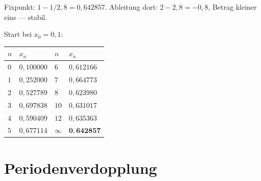 \begin{merksatz}
Fixpunkt: $1 - 1/2{,}8 = 0{,}642857$. Ableitung dort: $2 - 2{,}8 = -0{,}8$, Betrag kleiner eins --- stabil.

Start bei $x_0 = 0{,}1$:
\begin{center}
{\small
\renewcommand{\arraystretch}{1.38}
\begin{tabular}{@{}P{1.0cm}P{1.8cm}P{1.0cm}P{1.8cm}@{}}
\toprule
$n$ & $x_n$ & $n$ & $x_n$\\
\midrule
$0$ & $0{,}100000$ & $6$ & $0{,}612166$\\
$1$ & $0{,}252000$ & $7$ & $0{,}664773$\\
$2$ & $0{,}527789$ & $8$ & $0{,}623980$\\
$3$ & $0{,}697838$ & $10$ & $0{,}631017$\\
$4$ & $0{,}590409$ & $12$ & $0{,}635363$\\
$5$ & $0{,}677114$ & $\infty$ & $\mathbf{0{,}642857}$\\
\bottomrule
\end{tabular}}
\end{center}

\begin{center}
\begin{minipage}{0.88\textwidth}
\end{minipage}
\end{center}
\end{merksatz}

\section{Periodenverdopplung}

